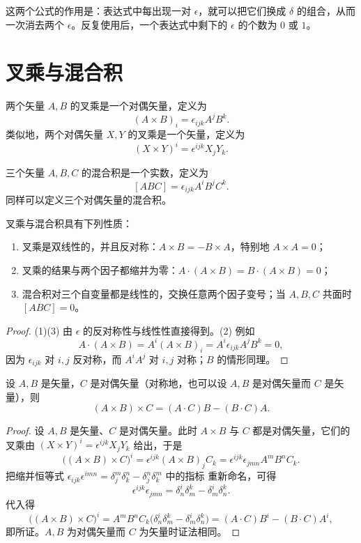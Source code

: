 \begin{remark}
这两个公式的作用是：表达式中每出现一对 $\epsilon$，就可以把它们换成 $\delta$ 的组合，从而
一次消去两个 $\epsilon$。反复使用后，一个表达式中剩下的 $\epsilon$ 的个数为 $0$ 或 $1$。
\end{remark}

\section{叉乘与混合积}

\begin{definition}[叉乘]
两个矢量 $A,B$ 的叉乘是一个对偶矢量，定义为
\[
(A\times B)_i=\epsilon_{ijk}A^jB^k .
\]
类似地，两个对偶矢量 $X,Y$ 的叉乘是一个矢量，定义为
\[
(X\times Y)^i=\epsilon^{ijk}X_jY_k .
\]
\end{definition}

\begin{definition}[混合积]
三个矢量 $A,B,C$ 的混合积是一个实数，定义为
\[
[ABC]=\epsilon_{ijk}A^iB^jC^k .
\]
同样可以定义三个对偶矢量的混合积。
\end{definition}

\begin{proposition}[基本性质]
叉乘与混合积具有下列性质：
\begin{enumerate}
\item 叉乘是双线性的，并且反对称：$A\times B=-B\times A$，特别地 $A\times A=0$；
\item 叉乘的结果与两个因子都缩并为零：$A\cdot(A\times B)=B\cdot(A\times B)=0$；
\item 混合积对三个自变量都是线性的，交换任意两个因子变号；当 $A,B,C$ 共面时 $[ABC]=0$。
\end{enumerate}
\end{proposition}

\begin{proof}
(1)(3) 由 $\epsilon$ 的反对称性与线性性直接得到。(2) 例如
\[
A\cdot(A\times B)=A^i(A\times B)_i=A^i\epsilon_{ijk}A^jB^k=0,
\]
因为 $\epsilon_{ijk}$ 对 $i,j$ 反对称，而 $A^iA^j$ 对 $i,j$ 对称；$B$ 的情形同理。
\end{proof}

\begin{theorem}[二重外积公式]
设 $A,B$ 是矢量，$C$ 是对偶矢量（对称地，也可以设 $A,B$ 是对偶矢量而 $C$ 是矢量），则
\[
(A\times B)\times C=(A\cdot C)B-(B\cdot C)A .
\]
\end{theorem}

\begin{proof}
设 $A,B$ 是矢量、$C$ 是对偶矢量。此时 $A\times B$ 与 $C$ 都是对偶矢量，它们的叉乘由
$(X\times Y)^i=\epsilon^{ijk}X_jY_k$ 给出，于是
\[
\bigl((A\times B)\times C\bigr)^i
=\epsilon^{ijk}(A\times B)_jC_k
=\epsilon^{ijk}\epsilon_{jmn}A^mB^nC_k .
\]
把缩并恒等式 $\epsilon_{ijk}\epsilon^{imn}=\delta^m_j\delta^n_k-\delta^n_j\delta^m_k$ 中的指标
重新命名，可得
\[
\epsilon^{ijk}\epsilon_{jmn}=\delta^i_n\delta^k_m-\delta^i_m\delta^k_n .
\]
代入得
\[
\bigl((A\times B)\times C\bigr)^i
=A^mB^nC_k\bigl(\delta^i_n\delta^k_m-\delta^i_m\delta^k_n\bigr)
=(A\cdot C)B^i-(B\cdot C)A^i ,
\]
即所证。$A,B$ 为对偶矢量而 $C$ 为矢量时证法相同。
\end{proof}


